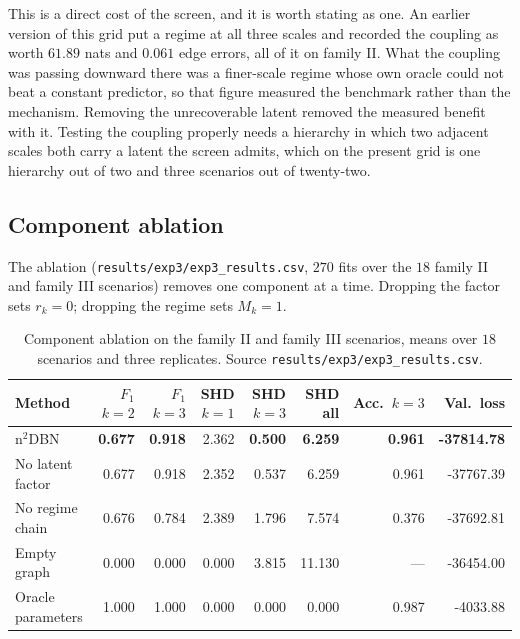 This is a direct cost of the screen, and it is worth stating as one. An earlier
version of this grid put a regime at all three scales and recorded the coupling
as worth $61.89$ nats and $0.061$ edge errors, all of it on family II. What the
coupling was passing downward there was a finer-scale regime whose own oracle
could not beat a constant predictor, so that figure measured the benchmark
rather than the mechanism. Removing the unrecoverable latent removed the
measured benefit with it. Testing the coupling properly needs a hierarchy in
which two adjacent scales both carry a latent the screen admits, which on the
present grid is one hierarchy out of two and three scenarios out of twenty-two.

\subsection{Component ablation}
\label{sec:results:ablation}

The ablation (\texttt{results/exp3/exp3\_results.csv}, $270$ fits over the $18$
family II and family III scenarios) removes one component at a time. Dropping
the factor sets $r_k = 0$; dropping the regime sets $M_k = 1$.

\begin{table}[t]
\centering
\caption{Component ablation on the family II and family III scenarios, means
over $18$ scenarios and three replicates. Source
\texttt{results/exp3/exp3\_results.csv}.}
\label{tab:results:ablation}
\small
\begin{tabular}{lrrrrrrr}
\toprule
Method & $F_1$ $k{=}2$ & $F_1$ $k{=}3$ & SHD $k{=}1$ & SHD $k{=}3$ & SHD all & Acc.\ $k{=}3$ & Val.\ loss \\
\midrule
n$^2$DBN          & \textbf{0.677} & \textbf{0.918} & 2.362 & \textbf{0.500} & \textbf{6.259} & \textbf{0.961} & \textbf{-37814.78} \\
No latent factor  & 0.677 & 0.918 & 2.352 & 0.537 & 6.259 & 0.961 & -37767.39 \\
No regime chain   & 0.676 & 0.784 & 2.389 & 1.796 & 7.574 & 0.376 & -37692.81 \\
Empty graph       & 0.000 & 0.000 & 0.000 & 3.815 & 11.130 & --- & -36454.00 \\
Oracle parameters & 1.000 & 1.000 & 0.000 & 0.000 & 0.000 & 0.987 & -4033.88 \\
\bottomrule
\end{tabular}
\end{table}

